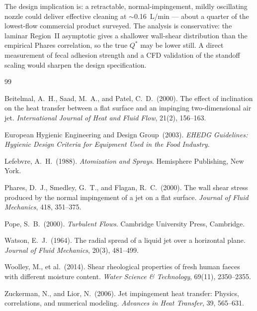 \documentclass[aps,prfluids,reprint,amsmath,amssymb,floatfix]{revtex4-2}
\begin{document}
The design implication is: a retractable, normal-impingement, mildly
oscillating nozzle could deliver effective cleaning at $\sim$\SI{0.16}{L/min}
--- about a quarter of the lowest-flow commercial product surveyed. The
analysis is conservative: the laminar Region~II asymptotic gives a
shallower wall-shear distribution than the empirical Phares correlation,
so the true $Q^*$ may be lower still. A direct measurement of fecal
adhesion strength and a CFD validation of the standoff scaling would
sharpen the design specification.



\begin{thebibliography}{99}

Beitelmal, A.~H., Saad, M.~A., and Patel, C.~D.\ (2000).
The effect of inclination on the heat transfer between a flat surface
and an impinging two-dimensional air jet.
\textit{International Journal of Heat and Fluid Flow}, 21(2), 156--163.

European Hygienic Engineering and Design Group\ (2003).
\textit{EHEDG Guidelines: Hygienic Design Criteria for Equipment Used
in the Food Industry}.

Lefebvre, A.~H.\ (1988).
\textit{Atomization and Sprays}.
Hemisphere Publishing, New York.

Phares, D.~J., Smedley, G.~T., and Flagan, R.~C.\ (2000).
The wall shear stress produced by the normal impingement of a jet
on a flat surface.
\textit{Journal of Fluid Mechanics}, 418, 351--375.

Pope, S.~B.\ (2000).
\textit{Turbulent Flows}.
Cambridge University Press, Cambridge.

Watson, E.~J.\ (1964).
The radial spread of a liquid jet over a horizontal plane.
\textit{Journal of Fluid Mechanics}, 20(3), 481--499.

Woolley, M., et al.\ (2014).
Shear rheological properties of fresh human faeces with different
moisture content.
\textit{Water Science \& Technology}, 69(11), 2350--2355.

Zuckerman, N., and Lior, N.\ (2006).
Jet impingement heat transfer: Physics, correlations, and numerical
modeling.
\textit{Advances in Heat Transfer}, 39, 565--631.

\end{thebibliography}
\end{document}
